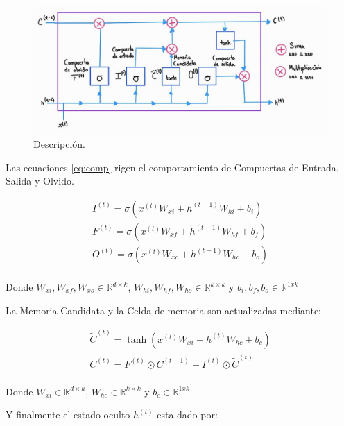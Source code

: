 \begin{figure}[ht!]
\centering
\includegraphics[width=1.0 \textwidth]{Chapters/2. Transformer/Figures/rnn/lstm.jpg}
\caption{Descripción.}
\label{fig:rnn_lstm}
\end{figure}

Las ecuaciones \ref{eq:comp} rigen el comportamiento de Compuertas de Entrada, Salida y Olvido.

\begin{equation}
    \begin{split}
        I^{(t)} =  \sigma(x^{(t)} W_{xi} + h^{(t-1)} W_{hi} + b_i)\\
        F^{(t)} =  \sigma(x^{(t)} W_{xf} + h^{(t-1)} W_{hf} + b_f)\\
        O^{(t)} =  \sigma(x^{(t)} W_{xo} + h^{(t-1)} W_{ho} + b_o)\\
    \end{split}
    \label{eq:comp}
\end{equation}

Donde $W_{xi}, W_{xf}, W_{xo} \in \mathbb{R}^{d \times k}$,
$W_{hi}, W_{hf}, W_{ho} \in \mathbb{R}^{k \times k}$ y $b_i, b_f, b_o \in \mathbb{R}^{1xk}$

La Memoria Candidata y la Celda de memoria son actualizadas mediante:

\begin{equation}
    \begin{split}
        \tilde C^{(t)} =  \tanh(x^{(t)} W_{xi} + h^{(t)} W_{hc} + b_c)\\
        C^{(t)} =  F^{(t)} \odot C^{(t-1)} + I^{(t)} \odot \tilde C^{(t)} \\
    \end{split}
\end{equation}

Donde $W_{xi} \in \mathbb{R}^{d \times k}$,
$W_{hc} \in \mathbb{R}^{k \times k}$ y $b_c \in \mathbb{R}^{1xk}$

Y finalmente el estado oculto $h^{(t)}$ esta dado por:

